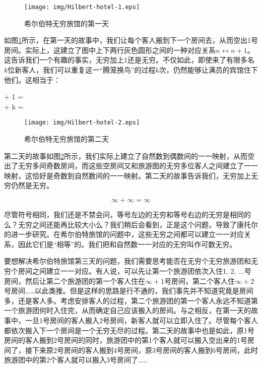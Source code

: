 \documentclass{article}
\begin{document}
\begin{figure}[htbp]
 \centering
 \texttt{[image: img/Hilbert-hotel-1.eps]}
 \caption{希尔伯特无穷旅馆的第一天}
 \label{fig:Hilbert-hotel-1}
\end{figure}

如图\ref{fig:Hilbert-hotel-1}所示，在第一天的故事中，我们让每个客人搬到下一个房间去，从而空出1号房间。实际上，这建立了图中上下两行灰色圆形之间的一种对应关系$n \leftrightarrow n+1$。这告诉我们一个有趣的事实，无穷加上1还是无穷。不仅如此，即使来了有限多名$k$位新客人，我们可以重复这一“腾笼换鸟”的过程$k$次，仍然能够让满员的宾馆住下他们。这相当于：

\bean
\infty + 1 = \infty \\
\infty + k = \infty \\
\eean

\begin{figure}[htbp]
 \centering
 \texttt{[image: img/Hilbert-hotel-2.eps]}
 \caption{希尔伯特无穷旅馆的第二天}
 \label{fig:Hilbert-hotel-2}
\end{figure}

第二天的故事如图\ref{fig:Hilbert-hotel-2}所示，我们实际上建立了自然数到偶数间的一一映射，从而空出了无穷多间奇数房间，而这些空房间又和旅游图的无穷多位客人之间建立了一一映射，这恰好是奇数到自然数间的一一映射。第二天的故事告诉我们，无穷加上无穷仍然是无穷。

\[
\infty + \infty = \infty
\]

尽管符号相同，我们还是不禁会问，等号左边的无穷和等号右边的无穷是相同的么？无穷之间还能再比较大小么？我们稍后会看到，正是这个问题，导致了康托尔的进一步研究。在希尔伯特旅馆的问题中，这些无穷之间都可以建立一一对应关系，因此它们是“相等”的。我们把和自然数一一对应的无穷叫作可数无穷。

要想解决希尔伯特旅馆第三天的问题，我们需要思考能否在无穷个无穷旅游团和无穷个房间之间建立一一对应。有人说，可以先让第一个旅游团依次入住1, 2, ...号房间，然后让第二个旅游团的第一个客人住在$\infty + 1$号房间，第二个客人住$\infty + 2$号房间……以此类推。但是这样的思路是行不通的，我们事先并不知道究竟是房间多，还是客人多。考虑安排客人的过程，第二个旅游团的第一个客人永远不知道第一个旅游团何时入住完，从而确定自己应该搬入的房间。与之相反，在第一天的故事中，一旦1号房间的客人搬入2号房间，新客人就可以立即入住了。尽管每个客人都依次搬入下一个房间是一个无穷无尽的过程。第二天的故事中也是如此，原1号房间的客人搬到2号房间的同时，旅游团中的第1个客人就可以搬入空出来的1号房间了，接下来原2号房间的客人搬到4号房间，原3号房间的客人搬到6号房间，此时旅游团中的第2个客人就可以搬入3号房间了……
\end{document}

